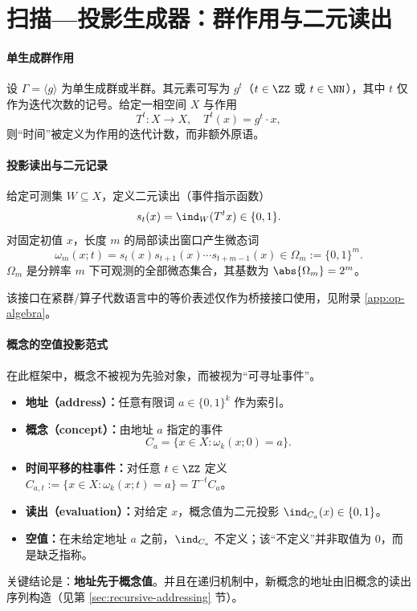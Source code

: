 \section{扫描—投影生成器：群作用与二元读出}\label{sec:spg}

\paragraph{单生成群作用}

设 $\Gamma=\langle g\rangle$ 为单生成群或半群。其元素可写为 $g^t$（$t\in\ZZ$ 或 $t\in\NN$），其中 $t$ 仅作为迭代次数的记号。给定一相空间 $X$ 与作用
\[
T^t:X\to X,\quad T^t(x)=g^t\cdot x,
\]
则“时间”被定义为作用的迭代计数，而非额外原语。

\paragraph{投影读出与二元记录}

给定可测集 $W\subseteq X$，定义二元读出（事件指示函数）
\[
s_t(x)=\ind_W(T^t x)\in\{0,1\}.
\]
对固定初值 $x$，长度 $m$ 的局部读出窗口产生微态词
\[
\omega_m(x;t)=s_t(x)s_{t+1}(x)\cdots s_{t+m-1}(x)\in \Omega_m:=\{0,1\}^m.
\]
$\Omega_m$ 是分辨率 $m$ 下可观测的全部微态集合，其基数为 $\abs{\Omega_m}=2^m$。

该接口在紧群/算子代数语言中的等价表述仅作为桥接接口使用，见附录 \ref{app:op-algebra}。

\paragraph{概念的空值投影范式}

在此框架中，概念不被视为先验对象，而被视为“可寻址事件”。
\begin{itemize}
  \item \textbf{地址（address）：}任意有限词 $a\in\{0,1\}^k$ 作为索引。
  \item \textbf{概念（concept）：}由地址 $a$ 指定的事件
  \[
  C_a=\{x\in X:\omega_k(x;0)=a\}.
  \]
  \item \textbf{时间平移的柱事件：}对任意 $t\in\ZZ$ 定义 $C_{a,t}:=\{x\in X:\omega_k(x;t)=a\}=T^{-t}C_a$。
  \item \textbf{读出（evaluation）：}对给定 $x$，概念值为二元投影 $\ind_{C_a}(x)\in\{0,1\}$。
\item \textbf{空值：}在未给定地址 $a$ 之前，$\ind_{C_a}$ 不定义；该“不定义”并非取值为 $0$，而是缺乏指称。
\end{itemize}

关键结论是：\textbf{地址先于概念值}。并且在递归机制中，新概念的地址由旧概念的读出序列构造（见第 \ref{sec:recursive-addressing} 节）。

